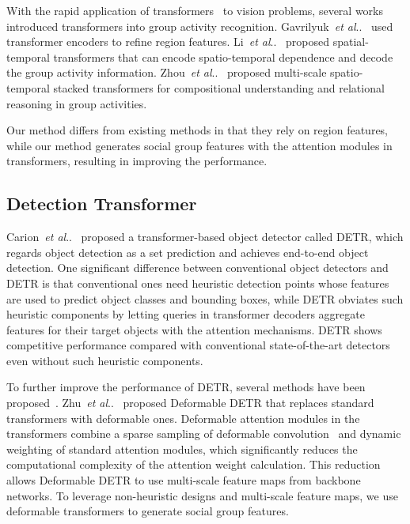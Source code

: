 \documentclass[runningheads]{llncs}
\makeatletter
\DeclareRobustCommand\onedot{\futurelet\@let@token\@onedot}
\def\@onedot{\ifx\@let@token.\else.\null\fi\xspace}
\def\etal{\emph{et al}\onedot}
\makeatother
\begin{document}
With the rapid application of transformers~\cite{vaswani_nips2017} to vision problems, several works introduced transformers into group activity recognition. Gavrilyuk~\etal~\cite{gavrilyuk_cvpr2020} used transformer encoders to refine region features. Li~\etal~\cite{li_iccv2021} proposed spatial-temporal transformers that can encode spatio-temporal dependence and decode the group activity information. Zhou~\etal~\cite{Zhou2021COMPOSERCL} proposed multi-scale spatio-temporal stacked transformers for compositional understanding and relational reasoning in group activities.

Our method differs from existing methods in that they rely on region features, while our method generates social group features with the attention modules in transformers, resulting in improving the performance.

\subsection{Detection Transformer}
Carion~\etal~\cite{carion_eccv2020} proposed a transformer-based object detector called DETR, which regards object detection as a set prediction and achieves end-to-end object detection. One significant difference between conventional object detectors and DETR is that conventional ones need heuristic detection points whose features are used to predict object classes and bounding boxes, while DETR obviates such heuristic components by letting queries in transformer decoders aggregate features for their target objects with the attention mechanisms. DETR shows competitive performance compared with conventional state-of-the-art detectors even without such heuristic components.

To further improve the performance of DETR, several methods have been proposed~\cite{zhu_iclr2021,dai_iccv2021,sun_iccv2021}.
Zhu~\etal~\cite{zhu_iclr2021} proposed Deformable DETR that replaces standard transformers with deformable ones. Deformable attention modules in the transformers combine a sparse sampling of deformable convolution~\cite{dai_iccv2017} and dynamic weighting of standard attention modules, which significantly reduces the computational complexity of the attention weight calculation. This reduction allows Deformable DETR to use multi-scale feature maps from backbone networks.
To leverage non-heuristic designs and multi-scale feature maps, we use deformable transformers to generate social group features.
\end{document}
